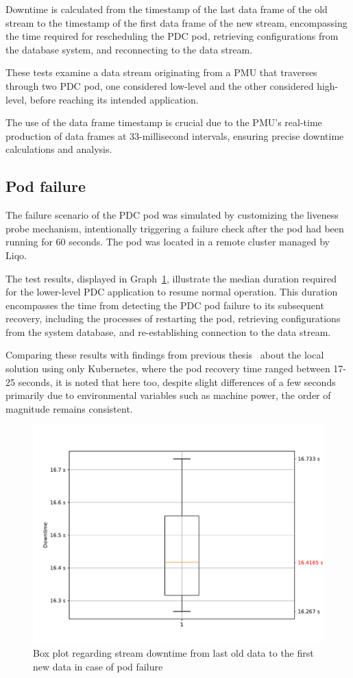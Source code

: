 Downtime is calculated from the timestamp of the last data frame of the old stream to the timestamp of the first data frame of the new stream, encompassing the time required for rescheduling the PDC pod, retrieving configurations from the database system, and reconnecting to the data stream.

These tests examine a data stream originating from a PMU that traverses through two PDC pod, one considered low-level and the other considered high-level, before reaching its intended application.

The use of the data frame timestamp is crucial due to the PMU's real-time production of data frames at 33-millisecond intervals, ensuring precise downtime calculations and analysis.

\subsection{Pod failure}
The failure scenario of the PDC pod was simulated by customizing the liveness probe mechanism, intentionally triggering a failure check after the pod had been running for 60 seconds. The pod was located in a remote cluster managed by Liqo.

The test results, displayed in Graph~\ref{graph:pod-down}, illustrate the median duration required for the lower-level PDC application to resume normal operation. This duration encompasses the time from detecting the PDC pod failure to its subsequent recovery, including the processes of restarting the pod, retrieving configurations from the system database, and re-establishing connection to the data stream.

Comparing these results with findings from previous thesis~\cite{e3-1} about the local solution using only Kubernetes,  where the pod recovery time ranged between 17-25 seconds, it is noted that here too, despite slight differences of a few seconds primarily due to environmental variables such as machine power, the order of magnitude remains consistent. 

\begin{figure}[ht]\centering
\includegraphics[scale=0.4]{Pictures/pdc-pod-down}
\caption{Box plot regarding stream downtime from last old data to the first new data in case of pod failure}\label{graph:pod-down}
\end{figure}

